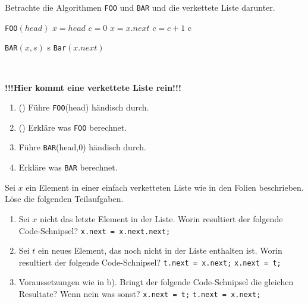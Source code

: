 \documentclass{uebung_cs}
\begin{document}
\begin{aufgabe}
	Betrachte die Algorithmen \texttt{FOO} und \texttt{BAR} und die verkettete Liste darunter.
	\begin{center}
	\begin{minipage}{0.45\textwidth}
		\begin{algorithmic}
			\STATE \texttt{FOO}$(head)$
			\STATE $x = head$
			\STATE $c = 0$
				\STATE $x = x.next$
				\STATE $c = c + 1$
			\ENDWHILE
			\RETURN c
		\end{algorithmic}
	\end{minipage}%
		\hfill
	\begin{minipage}{0.45\textwidth}
		\begin{algorithmic}
			\STATE \texttt{BAR}$(x,s)$
			\IF{$x == null$}
				\RETURN s
			\ELSE
				\RETURN \texttt{Bar}$(x.next)$
			\ENDIF
		\end{algorithmic}
	\end{minipage}\\%
	\end{center}
	
	\textbf{!!!Hier kommt eine verkettete Liste rein!!!}

	\begin{enumerate}
		\item (\warmup) Führe \texttt{FOO}(head) händisch durch.
		\item (\warmup) Erkläre was \texttt{FOO} berechnet.
		\item Führe \texttt{BAR}(head,0) händisch durch.
		\item Erkläre was \texttt{BAR} berechnet.
	\end{enumerate}
\end{aufgabe}

\begin{aufgabe}
	Sei $x$ ein Element in einer einfach verketteten Liste wie in den Folien beschrieben.
	Löse die folgenden Teilaufgaben.
	\begin{enumerate}
		\item Sei $x$ nicht das letzte Element in der Liste.
		Worin resultiert der folgende Code-Schnipsel?
		\hspace*{20pt}\texttt{x.next = x.next.next;}

		\item Sei $t$ ein neues Element, das noch nicht in der Liste enthalten ist.
		Worin resultiert der folgende Code-Schnipsel?
		\hspace*{20pt}\texttt{t.next = x.next;}
		\hspace*{20pt}\texttt{x.next = t;}

		\item Voraussetzungen wie in b).
		Bringt der folgende Code-Schnipsel die gleichen Resultate?
		Wenn nein was sonst?
		\hspace*{20pt}\texttt{x.next = t;}
		\hspace*{20pt}\texttt{t.next = x.next;}
	\end{enumerate}
\end{aufgabe}
\end{document}
